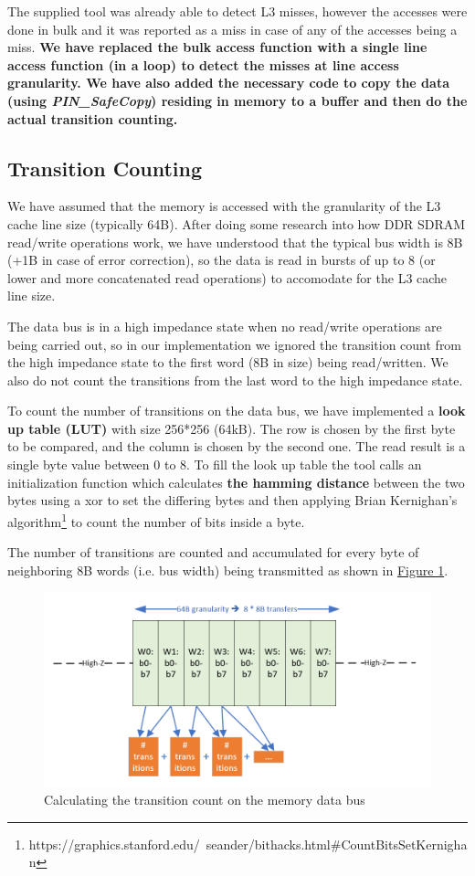 \documentclass[a4paper,12pt]{article}
\begin{document}
The supplied tool was already able to detect L3 misses, however the accesses were done in bulk and it was reported as a miss in case of any of the accesses being a miss. \textbf{We have replaced the bulk access function with a single line access function (in a loop) to detect the misses at line access granularity. We have also added the necessary code to copy the data (using \emph{PIN\_SafeCopy}) residing in memory to a buffer and then do the actual transition counting.}

\subsection{Transition Counting}
We have assumed that the memory is accessed with the granularity of the L3 cache line size (typically 64B). After doing some research into how DDR SDRAM read/write operations work, we have understood that the typical bus width is 8B (+1B in case of error correction), so the data is read in bursts of up to 8 (or lower and more concatenated read operations) to accomodate for the L3 cache line size.

The data bus is in a high impedance state when no read/write operations are being carried out, so in our implementation we ignored the transition count from the high impedance state to the first word (8B in size) being read/written. We also do not count the transitions from the last word to the high impedance state.

To count the number of transitions on the data bus, we have implemented a \textbf{look up table (LUT)} with size 256*256 (64kB). The row is chosen by the first byte to be compared, and the column is chosen by the second one. The read result is a single byte value between 0 to 8. To fill the look up table the tool calls an initialization function which calculates \textbf{the hamming distance} between the two bytes using a xor to set the differing bytes and then applying Brian Kernighan's algorithm\footnote{https://graphics.stanford.edu/~seander/bithacks.html\#CountBitsSetKernighan} to count the number of bits inside a byte. 

The number of transitions are counted and accumulated for every byte of neighboring 8B words (i.e. bus width) being transmitted as shown in \hyperref[fig_1]{Figure 1}. 

\begin{figure}[h]
		\label{fig_1}
		\centering
		\includegraphics[scale=0.5]{databus_1.png}
		\caption{Calculating the transition count on the memory data bus}
\end{figure}
\end{document}
